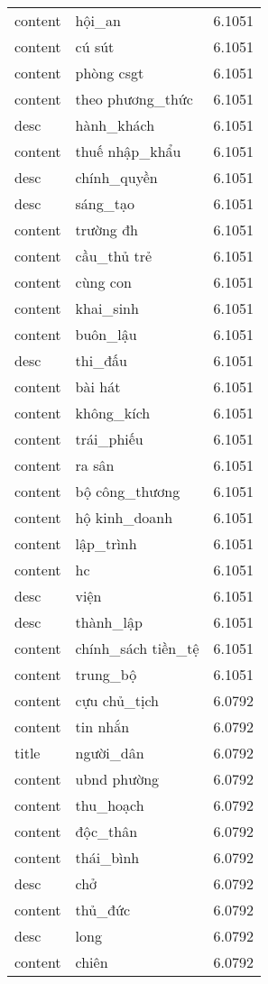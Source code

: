 \documentclass{article}
\begin{document}
\begin{tabular}{lll}
content & hội\_an & 6.1051\\
content & cú sút & 6.1051\\
content & phòng csgt & 6.1051\\
content & theo phương\_thức & 6.1051\\
desc & hành\_khách & 6.1051\\
content & thuế nhập\_khẩu & 6.1051\\
desc & chính\_quyền & 6.1051\\
desc & sáng\_tạo & 6.1051\\
content & trường đh & 6.1051\\
content & cầu\_thủ trẻ & 6.1051\\
content & cùng con & 6.1051\\
content & khai\_sinh & 6.1051\\
content & buôn\_lậu & 6.1051\\
desc & thi\_đấu & 6.1051\\
content & bài hát & 6.1051\\
content & không\_kích & 6.1051\\
content & trái\_phiếu & 6.1051\\
content & ra sân & 6.1051\\
content & bộ công\_thương & 6.1051\\
content & hộ kinh\_doanh & 6.1051\\
content & lập\_trình & 6.1051\\
content & hc & 6.1051\\
desc & viện & 6.1051\\
desc & thành\_lập & 6.1051\\
content & chính\_sách tiền\_tệ & 6.1051\\
content & trung\_bộ & 6.1051\\
content & cựu chủ\_tịch & 6.0792\\
content & tin nhắn & 6.0792\\
title & người\_dân & 6.0792\\
content & ubnd phường & 6.0792\\
content & thu\_hoạch & 6.0792\\
content & độc\_thân & 6.0792\\
content & thái\_bình & 6.0792\\
desc & chở & 6.0792\\
content & thủ\_đức & 6.0792\\
desc & long & 6.0792\\
content & chiên & 6.0792\\

\end{tabular}
\end{document}
